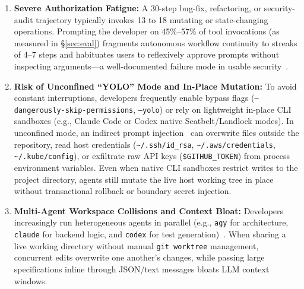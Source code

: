 \documentclass[10pt,twocolumn]{article}
\begin{document}
\begin{enumerate}
    \item \textbf{Severe Authorization Fatigue:} A 30-step bug-fix, refactoring, or security-audit trajectory typically invokes 13 to 18 mutating or state-changing operations. Prompting the developer on 45\%--57\% of tool invocations (as measured in \S\ref{sec:eval}) fragments autonomous workflow continuity to streaks of 4--7 steps and habituates users to reflexively approve prompts without inspecting arguments---a well-documented failure mode in usable security~\cite{felt2012android,akhawe2013alice}.
    \item \textbf{Risk of Unconfined ``YOLO'' Mode and In-Place Mutation:} To avoid constant interruptions, developers frequently enable bypass flags (\texttt{--dangerously-skip-permissions}, \texttt{--yolo}) or rely on lightweight in-place CLI sandboxes (e.g., Claude Code or Codex native Seatbelt/Landlock modes). In unconfined mode, an indirect prompt injection~\cite{greshake2023not,debenedetti2024agentdojo,zhan2024injecagent} can overwrite files outside the repository, read host credentials (\texttt{\textasciitilde/.ssh/id\_rsa}, \texttt{\textasciitilde/.aws/credentials}, \texttt{\textasciitilde/.kube/config}), or exfiltrate raw API keys (\texttt{\$GITHUB\_TOKEN}) from process environment variables. Even when native CLI sandboxes restrict writes to the project directory, agents still mutate the live host working tree in place without transactional rollback or boundary secret injection.
    \item \textbf{Multi-Agent Workspace Collisions and Context Bloat:} Developers increasingly run heterogeneous agents in parallel (e.g., \texttt{agy} for architecture, \texttt{claude} for backend logic, and \texttt{codex} for test generation)~\cite{wu2023autogen,hong2024metagpt}. When sharing a live working directory without manual \texttt{git worktree} management, concurrent edits overwrite one another's changes, while passing large specifications inline through JSON/text messages bloats LLM context windows.
\end{enumerate}
\end{document}
